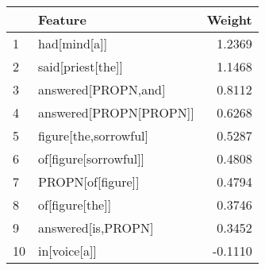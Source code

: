 \begin{tabular}{llr}
\toprule
{} &                 Feature &  Weight \\
\midrule
1  &            had[mind[a]] &  1.2369 \\
2  &       said[priest[the]] &  1.1468 \\
3  &     answered[PROPN,and] &  0.8112 \\
4  &  answered[PROPN[PROPN]] &  0.6268 \\
5  &   figure[the,sorrowful] &  0.5287 \\
6  &   of[figure[sorrowful]] &  0.4808 \\
7  &       PROPN[of[figure]] &  0.4794 \\
8  &         of[figure[the]] &  0.3746 \\
9  &      answered[is,PROPN] &  0.3452 \\
10 &            in[voice[a]] & -0.1110 \\
\bottomrule
\end{tabular}
